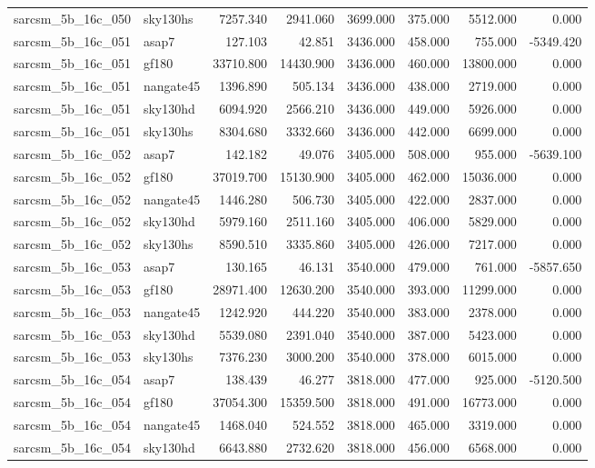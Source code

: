 \begin{tabular}{llrrrrrr}
sarcsm\_5b\_16c\_050 & sky130hs & 7257.340 & 2941.060 & 3699.000 & 375.000 & 5512.000 & 0.000 \\
sarcsm\_5b\_16c\_051 & asap7 & 127.103 & 42.851 & 3436.000 & 458.000 & 755.000 & -5349.420 \\
sarcsm\_5b\_16c\_051 & gf180 & 33710.800 & 14430.900 & 3436.000 & 460.000 & 13800.000 & 0.000 \\
sarcsm\_5b\_16c\_051 & nangate45 & 1396.890 & 505.134 & 3436.000 & 438.000 & 2719.000 & 0.000 \\
sarcsm\_5b\_16c\_051 & sky130hd & 6094.920 & 2566.210 & 3436.000 & 449.000 & 5926.000 & 0.000 \\
sarcsm\_5b\_16c\_051 & sky130hs & 8304.680 & 3332.660 & 3436.000 & 442.000 & 6699.000 & 0.000 \\
sarcsm\_5b\_16c\_052 & asap7 & 142.182 & 49.076 & 3405.000 & 508.000 & 955.000 & -5639.100 \\
sarcsm\_5b\_16c\_052 & gf180 & 37019.700 & 15130.900 & 3405.000 & 462.000 & 15036.000 & 0.000 \\
sarcsm\_5b\_16c\_052 & nangate45 & 1446.280 & 506.730 & 3405.000 & 422.000 & 2837.000 & 0.000 \\
sarcsm\_5b\_16c\_052 & sky130hd & 5979.160 & 2511.160 & 3405.000 & 406.000 & 5829.000 & 0.000 \\
sarcsm\_5b\_16c\_052 & sky130hs & 8590.510 & 3335.860 & 3405.000 & 426.000 & 7217.000 & 0.000 \\
sarcsm\_5b\_16c\_053 & asap7 & 130.165 & 46.131 & 3540.000 & 479.000 & 761.000 & -5857.650 \\
sarcsm\_5b\_16c\_053 & gf180 & 28971.400 & 12630.200 & 3540.000 & 393.000 & 11299.000 & 0.000 \\
sarcsm\_5b\_16c\_053 & nangate45 & 1242.920 & 444.220 & 3540.000 & 383.000 & 2378.000 & 0.000 \\
sarcsm\_5b\_16c\_053 & sky130hd & 5539.080 & 2391.040 & 3540.000 & 387.000 & 5423.000 & 0.000 \\
sarcsm\_5b\_16c\_053 & sky130hs & 7376.230 & 3000.200 & 3540.000 & 378.000 & 6015.000 & 0.000 \\
sarcsm\_5b\_16c\_054 & asap7 & 138.439 & 46.277 & 3818.000 & 477.000 & 925.000 & -5120.500 \\
sarcsm\_5b\_16c\_054 & gf180 & 37054.300 & 15359.500 & 3818.000 & 491.000 & 16773.000 & 0.000 \\
sarcsm\_5b\_16c\_054 & nangate45 & 1468.040 & 524.552 & 3818.000 & 465.000 & 3319.000 & 0.000 \\
sarcsm\_5b\_16c\_054 & sky130hd & 6643.880 & 2732.620 & 3818.000 & 456.000 & 6568.000 & 0.000 \\

\end{tabular}
